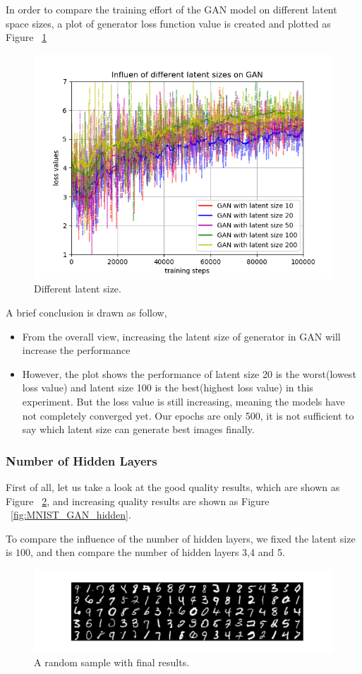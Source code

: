 \documentclass[12pt,letterpaper]{article}
\begin{document}
In order to compare the training effort of the GAN model on different latent space sizes, a plot of generator loss function value is created and plotted as Figure ~\ref{fig:gen_latent}
\begin{figure}[h]
    \centering
    \includegraphics[width=.6\linewidth]{GAN_MNIST_latents.png}
    \caption{\small Different latent size.}
    \label{fig:gen_latent}
\end{figure}



A brief conclusion is drawn as follow,
\begin{itemize}
    \item From the overall view, increasing the latent size of generator in GAN will increase the performance
    \item However, the plot shows the performance of latent size 20 is the worst(lowest loss value) and latent size 100 is the best(highest loss value) in this experiment. But the loss value is still increasing, meaning the models have not completely converged yet. Our epochs are only 500, it is not sufficient to say which latent size can generate best images finally.
\end{itemize}
 


\subsubsection{Number of Hidden Layers}

First of all, let us take a look at the good quality results, which are shown as Figure ~\ref{fig:MNIST_GAN_hidden_results}, and increasing quality results are shown as Figure ~\ref{fig:MNIST_GAN_hidden}.

To compare the influence of the number of hidden layers, we fixed the latent size is $100$, and then compare the number of hidden layers 3,4 and 5.

\begin{figure}[h]
    \centering
    \includegraphics[width=.6\linewidth]{GAN_MNIST_2_100_256results.png}
    \caption{\small A random sample with final results.}
    \label{fig:MNIST_GAN_hidden_results}
\end{figure}
\end{document}
